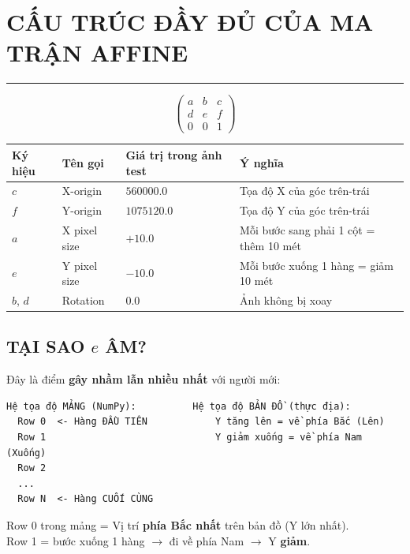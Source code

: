 \documentclass[12pt,a4paper]{report}
\begin{document}
\chapter{CẤU TRÚC ĐẦY ĐỦ CỦA MA TRẬN AFFINE}
\noindent\rule{\textwidth}{0.4pt}

\begin{equation*}
\begin{pmatrix}
    a  &  b  &  c \\
    d  &  e  &  f \\
    0  &  0  &  1
\end{pmatrix}
\end{equation*}
\begin{table}[H]
\centering
\begin{tabularx}{\textwidth}{|l|l|l|X|}
\hline
\rowcolor{blue!80!black}
{\color{white}\textbf{Ký hiệu}} & {\color{white}\textbf{Tên gọi}} & {\color{white}\textbf{Giá trị trong ảnh test}} & {\color{white}\textbf{Ý nghĩa}} \\
\hline
$c$ & X-origin & $560000.0$ & Tọa độ X của góc trên-trái \\
$f$ & Y-origin & $1075120.0$ & Tọa độ Y của góc trên-trái \\
$a$ & X pixel size & $+10.0$ & Mỗi bước sang phải 1 cột = thêm 10 mét \\
$e$ & Y pixel size & $-10.0$ & Mỗi bước xuống 1 hàng = giảm 10 mét \\
$b$, $d$ & Rotation & $0.0$ & Ảnh không bị xoay \\
\hline
\end{tabularx}
\end{table}

\section{TẠI SAO $e$ ÂM?}

Đây là điểm \textbf{gây nhầm lẫn nhiều nhất} với người mới:

\begin{verbatim}
Hệ tọa độ MẢNG (NumPy):          Hệ tọa độ BẢN ĐỒ (thực địa):
  Row 0  <- Hàng ĐẦU TIÊN            Y tăng lên = về phía Bắc (Lên)
  Row 1                              Y giảm xuống = về phía Nam (Xuống)
  Row 2
  ...
  Row N  <- Hàng CUỐI CÙNG
\end{verbatim}

Row 0 trong mảng = Vị trí \textbf{phía Bắc nhất} trên bản đồ (Y lớn nhất). \\
Row 1 = bước xuống 1 hàng $\rightarrow$ đi về phía Nam $\rightarrow$ Y \textbf{giảm}.
\end{document}
